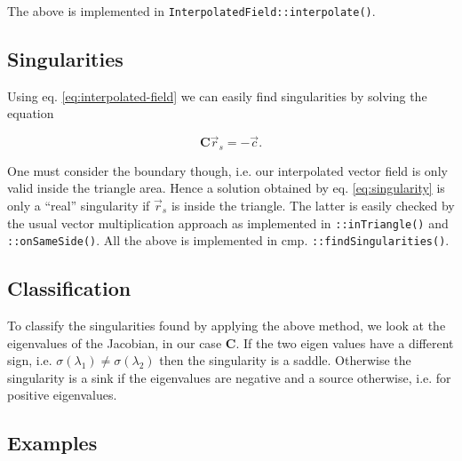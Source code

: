 \documentclass[a4paper,10pt,notitlepage]{scrreprt}
\newcommand{\mat}[1]{\mathbf{#1}}
\begin{document}
The above is implemented in \texttt{InterpolatedField::interpolate()}.

\subsection{Singularities}

Using eq. \ref{eq:interpolated-field} we can easily find singularities by
solving the equation

\begin{equation}
 \mat{C} \vec{r}_s = - \vec{c}.
 \label{eq:singularity}
\end{equation}

One must consider the boundary though, i.e. our interpolated vector field is
only valid inside the triangle area. Hence a solution obtained by
eq. \ref{eq:singularity} is only a ``real'' singularity if $\vec{r}_s$ is
inside the triangle. The latter is easily checked by the usual vector
multiplication approach as implemented in \texttt{::inTriangle()} and
\texttt{::onSameSide()}. All the above is implemented in cmp.
\texttt{::findSingularities()}.

\subsection{Classification}

To classify the singularities found by applying the above method, we look at
the eigenvalues of the Jacobian, in our case $\mat{C}$. If the two eigen values
have a different sign, i.e. $\sigma(\lambda_1) \neq \sigma(\lambda_2)$ then the
singularity is a saddle. Otherwise the singularity is a sink if the eigenvalues
are negative and a source otherwise, i.e. for positive eigenvalues.

\subsection{Examples}
\end{document}
